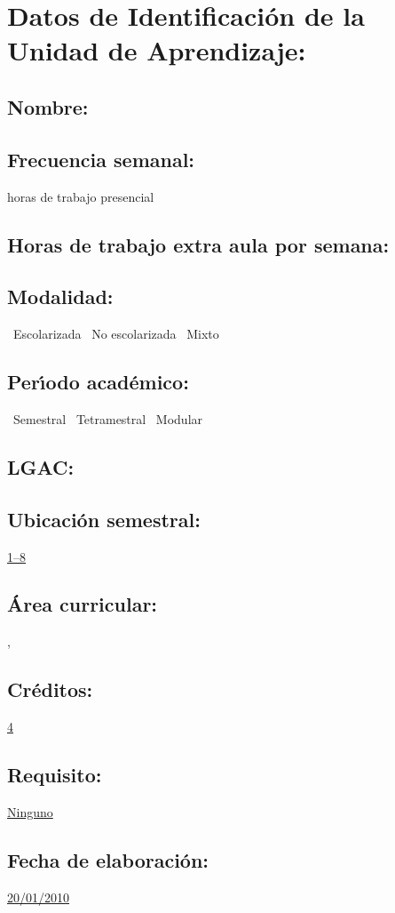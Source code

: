 \documentclass[10 pt]{article}
\begin{document}

\section{Datos de Identificaci\'{o}n de la Unidad de Aprendizaje:}
\subsection{Nombre:} 
\subsection{Frecuencia semanal:} horas de trabajo presencial 
\subsection{Horas de trabajo extra aula por semana:} 
\subsection{Modalidad:} \yes~Escolarizada \no~No escolarizada \no~Mixto
\subsection{Per\'{\i}odo acad\'{e}mico:} \yes~Semestral
\no~Tetramestral \no~Modular
\subsection{LGAC:} \underline{\seys}
\subsection{Ubicaci\'{o}n semestral:} \underline{1--8}
\subsection{\'{A}rea curricular:} \underline{\fr, \le}
\subsection{Cr\'{e}ditos:} \underline{4}
\subsection{Requisito:} \underline{Ninguno}
\subsection{Fecha de elaboraci\'{o}n:} \underline{20/01/2010}
\end{document}
